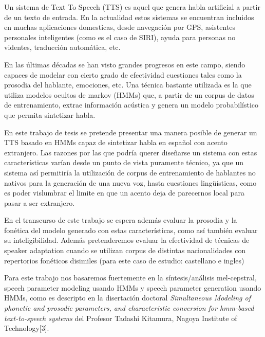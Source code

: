 

Un sistema de Text To Speech (TTS) es aquel que genera habla artificial a partir de un texto de entrada. En la actualidad estos sistemas se encuentran incluidos en muchas aplicaciones domesticas, desde navegación por GPS, asistentes personales inteligentes (como es el caso de SIRI), ayuda para personas no videntes, traducción automática, etc.

En las últimas décadas se han visto grandes progresos en este campo, siendo capaces de modelar con cierto grado de efectividad cuestiones tales como la prosodia del hablante, emociones, etc. Una técnica bastante utilizada es la que utiliza modelos ocultos de markov (HMMs) que, a partir de un corpus de datos de entrenamiento, extrae información acústica y genera un modelo probabilístico que permita sintetizar habla. 



En este trabajo de tesis se pretende presentar una manera posible de generar un TTS basado en HMMs capaz de sintetizar habla en español con acento extranjero. Las razones por las que podría querer diseñarse un sistema con estas características varían desde un punto de vista puramente técnico, ya que un sistema así permitiría la utilización de corpus de entrenamiento de hablantes no nativos para la generación de una nueva voz, hasta cuestiones lingüísticas, como es poder vislumbrar el limite en que un acento deja de parecernos local para pasar a ser extranjero.

En el transcurso de este trabajo se espera además evaluar la prosodia y la fonética del modelo generado con estas características, como así también evaluar su inteligibilidad. Además pretenderemos evaluar la efectividad de técnicas de speaker adaptation cuando se utilizan corpus de distintas nacionalidades con repertorios fonéticos disimiles (para este caso de estudio: castellano e ingles)

Para este trabajo nos basaremos fuertemente en la síntesis/análisis mel-cepstral, speech parameter modeling usando HMMs y speech parameter generation usando HMMs, como es descripto en la disertación doctoral \textit{Simultaneous Modeling of phonetic and prosodic parameters, and characteristic conversion for hmm-based text-to-speech systems} del Profesor Tadashi Kitamura, Nagoya Institute of Technology[3].
